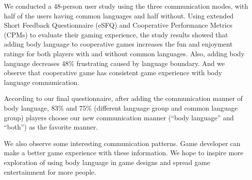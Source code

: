 We conducted a 48-person user study using the three communication modes, with half of the users having common languages and half without. Using extended Short Feedback Questionnaire (eSFQ)\cite{eSFQ} and Cooperative Performance Metrics (CPMs)\cite{CPMs} to evaluate their gaming experience, the study results showed that adding body language to cooperative games increases the fun and enjoyment ratings for both players with and without common languages. 
Also, adding body language decreases 48\% frustrating caused by language boundary. And we observe that cooperative game has consistent game experience with body language communication.

According to our final questionnaire, after adding the communication manner of body language, 83\% and 75\% (different language group and common language group) players choose our new communication manner (``body language'' and ``both'') as the favorite manner. 

We also observe some interesting communication patterns. Game developer can make a better game experience with these information. We hope to inspire more exploration of using body language in game designs and spread game entertainment for more people.




